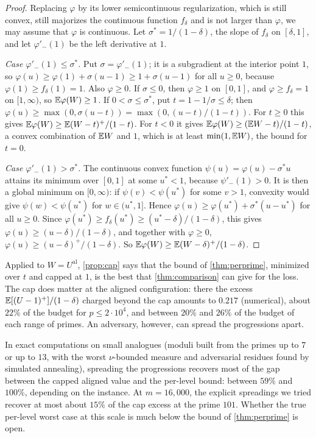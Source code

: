 \begin{proof}
Replacing $\varphi$ by its lower semicontinuous regularization, which is still convex, still majorizes the
continuous function $f_\delta$ and is not larger than $\varphi$, we may assume that $\varphi$ is continuous. Let
$\sigma^*=1/(1-\delta)$, the slope of $f_\delta$ on $[\delta,1]$, and let $\varphi'_-(1)$ be the left derivative at $1$.

\emph{Case $\varphi'_-(1)\le\sigma^*$.} Put $\sigma=\varphi'_-(1)$; it is a subgradient at the interior point $1$, so
$\varphi(u)\ge\varphi(1)+\sigma(u-1)\ge1+\sigma(u-1)$ for all $u\ge0$, because $\varphi(1)\ge f_\delta(1)=1$. Also
$\varphi\ge0$. If $\sigma\le0$, then $\varphi\ge1$ on $[0,1]$, and $\varphi\ge f_\delta=1$ on $[1,\infty)$, so
$\mathbb{E}\varphi(W)\ge1$. If $0<\sigma\le\sigma^*$, put $t=1-1/\sigma\le\delta$; then
$\varphi(u)\ge\max(0,\sigma(u-t))=\max(0,(u-t)/(1-t))$. For $t\ge0$ this gives $\mathbb{E}\varphi(W)\ge\mathbb{E}(W-t)^+/(1-t)$.
For $t<0$ it gives $\mathbb{E}\varphi(W)\ge(\mathbb{E} W-t)/(1-t)$, a convex combination of $\mathbb{E} W$ and $1$, which is at least
$\min(1,\mathbb{E} W)$, the bound for $t=0$.

\emph{Case $\varphi'_-(1)>\sigma^*$.} The continuous convex function $\psi(u)=\varphi(u)-\sigma^*u$ attains its
minimum over $[0,1]$ at some $u^*<1$, because $\psi'_-(1)>0$. It is then a global minimum on $[0,\infty)$: if
$\psi(v)<\psi(u^*)$ for some $v>1$, convexity would give $\psi(w)<\psi(u^*)$ for $w\in(u^*,1]$. Hence
$\varphi(u)\ge\varphi(u^*)+\sigma^*(u-u^*)$ for all $u\ge0$. Since
$\varphi(u^*)\ge f_\delta(u^*)\ge(u^*-\delta)/(1-\delta)$, this gives $\varphi(u)\ge(u-\delta)/(1-\delta)$, and together
with $\varphi\ge0$, $\varphi(u)\ge(u-\delta)^+/(1-\delta)$. So $\mathbb{E}\varphi(W)\ge\mathbb{E}(W-\delta)^+/(1-\delta)$.
\end{proof}

Applied to $W=U^{\mathrm{al}}$, \cref{prop:cap} says that the bound of \cref{thm:perprime}, minimized over $t$ and
capped at $1$, is the best that \cref{thm:comparison} can give for the loss. The cap does matter at the aligned
configuration: there the excess $\mathbb{E}[(U-1)^+]/(1-\delta)$ charged beyond the cap amounts to $0.217$ (numerical),
about $22\%$ of the budget for $p\le2\cdot10^4$, and between $20\%$ and $26\%$ of the budget of each range of primes.
An adversary, however, can spread the progressions apart.

\begin{observation}[spreading]\label{obs:spread}
In exact computations on small analogues (moduli built from the primes up to $7$ or up to $13$, with the worst
$\nu$-bounded measure and adversarial residues found by simulated annealing), spreading the progressions recovers
most of the gap between the capped aligned value and the per-level bound: between $59\%$ and $100\%$, depending on
the instance. At $m=16{,}000$, the explicit spreadings we tried recover at most about $15\%$ of the cap excess at the
prime $101$. Whether the true per-level worst case at this scale is much below the bound of \cref{thm:perprime} is
open.
\end{observation}

